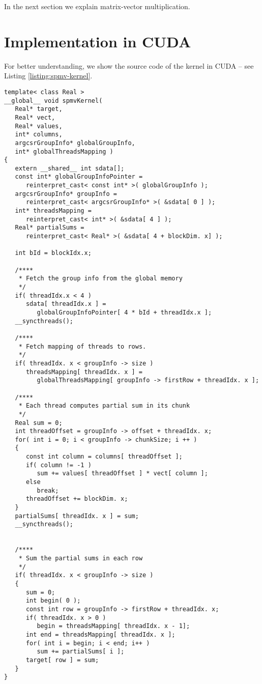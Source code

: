 \documentclass{pj}
\begin{document}
In the next section we explain matrix-vector multiplication.

\section{Implementation in CUDA}
\label{sect:cuda-implementation}
 
For better understanding, we show the source code of the kernel in CUDA -- see Listing \ref{listing:spmv-kernel}.

\begin{lstlisting}[caption={Kernel for matrix-vector multiplication},label={listing:spmv-kernel}]
template< class Real >
__global__ void spmvKernel( 
   Real* target,
   Real* vect,
   Real* values,
   int* columns,
   argcsrGroupInfo* globalGroupInfo,
   int* globalThreadsMapping )
{
   extern __shared__ int sdata[];
   const int* globalGroupInfoPointer = 
      reinterpret_cast< const int* >( globalGroupInfo );
   argcsrGroupInfo* groupInfo = 
      reinterpret_cast< argcsrGroupInfo* >( &sdata[ 0 ] );
   int* threadsMapping = 
      reinterpret_cast< int* >( &sdata[ 4 ] );
   Real* partialSums = 
      reinterpret_cast< Real* >( &sdata[ 4 + blockDim. x] );

   int bId = blockIdx.x;
   
   /****
    * Fetch the group info from the global memory
    */
   if( threadIdx.x < 4 )
      sdata[ threadIdx.x ] = 
         globalGroupInfoPointer[ 4 * bId + threadIdx.x ];
   __syncthreads();

   /****
    * Fetch mapping of threads to rows.
    */
   if( threadIdx. x < groupInfo -> size )
      threadsMapping[ threadIdx. x ] = 
         globalThreadsMapping[ groupInfo -> firstRow + threadIdx. x ];

   /****
    * Each thread computes partial sum in its chunk
    */
   Real sum = 0;
   int threadOffset = groupInfo -> offset + threadIdx. x;
   for( int i = 0; i < groupInfo -> chunkSize; i ++ )
   {
      const int column = columns[ threadOffset ];
      if( column != -1 )
         sum += values[ threadOffset ] * vect[ column ];
      else
         break;
      threadOffset += blockDim. x;
   }
   partialSums[ threadIdx. x ] = sum;
   __syncthreads();


   /****
    * Sum the partial sums in each row
    */
   if( threadIdx. x < groupInfo -> size )
   {
      sum = 0;
      int begin( 0 );
      const int row = groupInfo -> firstRow + threadIdx. x;
      if( threadIdx. x > 0 )
         begin = threadsMapping[ threadIdx. x - 1];
      int end = threadsMapping[ threadIdx. x ];
      for( int i = begin; i < end; i++ )
         sum += partialSums[ i ];
      target[ row ] = sum;
   }
}
\end{lstlisting}
\end{document}
